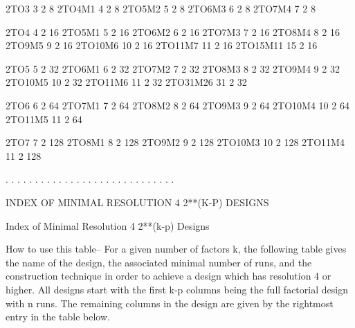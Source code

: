   2TO3           3            2                      8
  2TO4M1         4            2                      8
  2TO5M2         5            2                      8
  2TO6M3         6            2                      8
  2TO7M4         7            2                      8
 
  2TO4           4            2                     16
  2TO5M1         5            2                     16
  2TO6M2         6            2                     16
  2TO7M3         7            2                     16
  2TO8M4         8            2                     16
  2TO9M5         9            2                     16
  2TO10M6       10            2                     16
  2TO11M7       11            2                     16
  2TO15M11      15            2                     16
 
  2TO5           5            2                     32
  2TO6M1         6            2                     32
  2TO7M2         7            2                     32
  2TO8M3         8            2                     32
  2TO9M4         9            2                     32
  2TO10M5       10            2                     32
  2TO11M6       11            2                     32
  2TO31M26      31            2                     32
 
  2TO6           6            2                     64
  2TO7M1         7            2                     64
  2TO8M2         8            2                     64
  2TO9M3         9            2                     64
  2TO10M4       10            2                     64
  2TO11M5       11            2                     64
 
  2TO7           7            2                    128
  2TO8M1         8            2                    128
  2TO9M2         9            2                    128
  2TO10M3       10            2                    128
  2TO11M4       11            2                    128
 
. . . . . . . . . . . . . . . . . . . . . . . . . . . . .
 
INDEX OF MINIMAL RESOLUTION 4 2**(K-P) DESIGNS
 
Index of Minimal Resolution 4 2**(k-p) Designs
 
How to use this table--
   For a given number of factors k, the
   following table gives the name of the
   design, the associated minimal number
   of runs, and the construction technique
   in order to achieve a design which has
   resolution 4 or higher.  All designs start
   with the first k-p columns being the full
   factorial design with n runs.  The remaining
   columns in the design are given by the
   rightmost entry in the table below.
 
